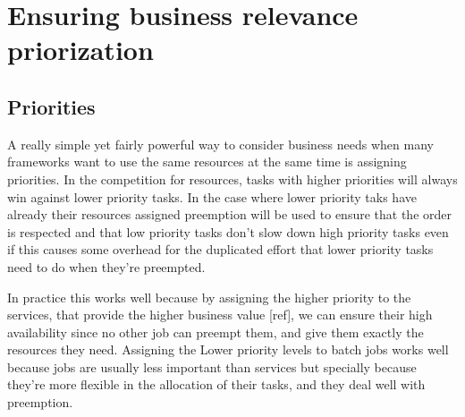\documentclass{svjour3}                     %
\begin{document}
\section{Ensuring business relevance priorization}
\label{sec:businessrelevance}

\subsection{Priorities}

A really simple yet fairly powerful way to consider business needs
when many frameworks want to use the same resources at the same time
is assigning priorities. In the competition for resources, tasks with
higher priorities will always win against lower priority tasks. In the
case where lower priority taks have already their resources assigned
preemption will be used to ensure that the order is respected and that
low priority tasks don't slow down high priority tasks even if this
causes some overhead for the duplicated effort that lower priority
tasks need to do when they're preempted.

In practice this works well because by assigning the higher priority
to the services, that provide the higher business value [ref], we can
ensure their high availability since no other job can preempt them,
and give them exactly the resources they need. Assigning the Lower
priority levels to batch jobs works well because jobs are usually less
important than services but specially because they're more flexible in
the allocation of their tasks, and they deal well with preemption.




\end{document}
